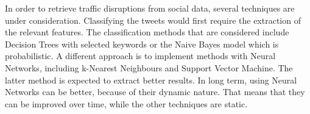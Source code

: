 In order to retrieve traffic disruptions from social data, several techniques are under consideration. Classifying the tweets would first require the extraction of the relevant features. The classification methods that are considered include Decision Trees with selected keywords or the Naive Bayes model which is probabilistic. A different approach is to implement methods with Neural Networks, including k-Nearest Neighbours and Support Vector Machine. The latter method is expected to extract better results. In long term, using Neural Networks can be better, because of their dynamic nature. That means that they can be improved over time, while the other techniques are static.
